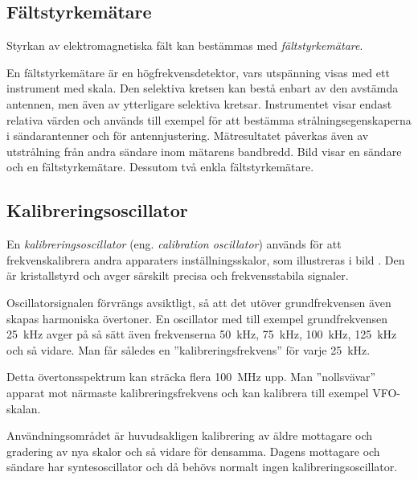 \subsection{Fältstyrkemätare}
\label{fältstyrkemätare}


Styrkan av elektromagnetiska fält kan bestämmas med \emph{fältstyrkemätare}.

En fältstyrkemätare är en högfrekvensdetektor, vars utspänning visas med ett
instrument med skala.
Den selektiva kretsen kan bestå enbart av den avstämda antennen, men även av
ytterligare selektiva kretsar.
Instrumentet visar endast relativa värden och används till exempel för att
bestämma strålningsegenskaperna i sändarantenner och för antennjustering.
Mätresultatet påverkas även av utstrålning från andra sändare inom mätarens
bandbredd.
Bild  visar en sändare och en fältstyrkemätare.
Dessutom två enkla fältstyrkemätare.

\newpage
\subsection{Kalibreringsoscillator}


En \emph{kalibreringsoscillator} (eng. \emph{calibration oscillator}) används
för att frekvenskalibrera andra apparaters inställningsskalor, som illustreras
i bild .
Den är kristallstyrd och avger särskilt precisa och frekvensstabila signaler.

Oscillatorsignalen förvrängs avsiktligt, så att det utöver grundfrekvensen även
skapas harmoniska övertoner.
En oscillator med till exempel grundfrekvensen \qty{25}{\kilo\hertz} avger på så
sätt även frekvenserna \qty{50}{\kilo\hertz}, \qty{75}{\kilo\hertz},
\qty{100}{\kilo\hertz}, \qty{125}{\kilo\hertz} och så vidare.
Man får således en ''kalibreringsfrekvens'' för varje \qty{25}{\kilo\hertz}.

Detta övertonsspektrum kan sträcka flera \qty{100}{\mega\hertz} upp.
Man ''nollsvävar'' apparat mot närmaste kalibreringsfrekvens och kan kalibrera
till exempel VFO-skalan.

Användningsområdet är huvudsakligen kalibrering av äldre mottagare och gradering
av nya skalor och så vidare för densamma.
Dagens mottagare och sändare har syntesoscillator och då behövs normalt ingen
kalibreringsoscillator.

